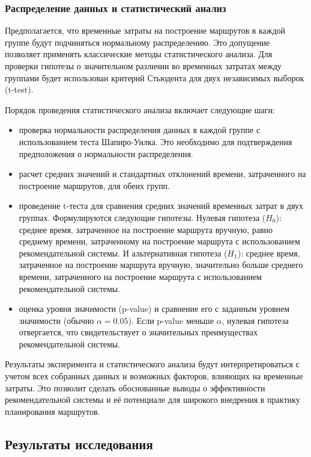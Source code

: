 \subsubsection{Распределение данных и статистический анализ}

Предполагается, что временные затраты на построение маршрутов в каждой группе будут подчиняться нормальному распределению. Это допущение позволяет применять классические методы статистического анализа. Для проверки гипотезы о значительном различии во временных затратах между группами будет использован критерий Стьюдента для двух независимых выборок (t-test).

Порядок проведения статистического анализа включает следующие шаги:

\begin{itemize}
\item проверка нормальности распределения данных в каждой группе с использованием теста Шапиро-Уилка. Это необходимо для подтверждения предположения о нормальности распределения.
\item расчет средних значений и стандартных отклонений времени, затраченного на построение маршрутов, для обеих групп.
\item проведение t-теста для сравнения средних значений временных затрат в двух группах. Формулируются следующие гипотезы. Нулевая гипотеза ($H_0$): среднее время, затраченное на построение маршрута вручную, равно среднему времени, затраченному на построение маршрута с использованием рекомендательной системы. И альтернативная гипотеза ($H_1$): среднее время, затраченное на построение маршрута вручную, значительно больше среднего времени, затраченного на построение маршрута с использованием рекомендательной системы.
\item оценка уровня значимости (p-value) и сравнение его с заданным уровнем значимости (обычно $\alpha = 0.05$). Если p-value меньше $\alpha$, нулевая гипотеза отвергается, что свидетельствует о значительных преимуществах рекомендательной системы.
\end{itemize}

Результаты эксперимента и статистического анализа будут интерпретироваться с учетом всех собранных данных и возможных факторов, влияющих на временные затраты. Это позволит сделать обоснованные выводы о эффективности рекомендательной системы и её потенциале для широкого внедрения в практику планирования маршрутов.

\subsection{Результаты исследования}

